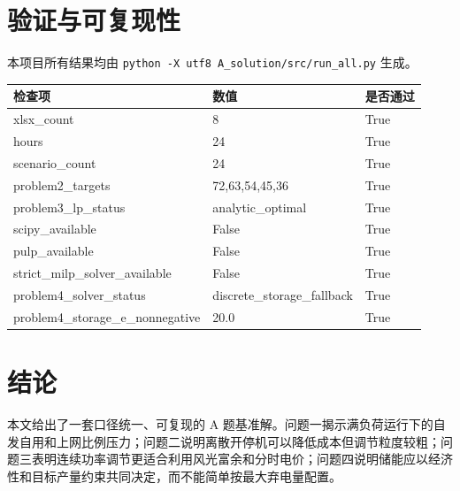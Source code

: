 \documentclass[12pt]{article}
\begin{document}
\section{验证与可复现性}
本项目所有结果均由 \texttt{python -X utf8 A\_solution/src/run\_all.py} 生成。
\begin{longtable}{lll}\toprule
检查项 & 数值 & 是否通过 \\\midrule
xlsx\_count & 8 & True \\
hours & 24 & True \\
scenario\_count & 24 & True \\
problem2\_targets & 72,63,54,45,36 & True \\
problem3\_lp\_status & analytic\_optimal & True \\
scipy\_available & False & True \\
pulp\_available & False & True \\
strict\_milp\_solver\_available & False & True \\
problem4\_solver\_status & discrete\_storage\_fallback & True \\
problem4\_storage\_e\_nonnegative & 20.0 & True \\
\bottomrule
\end{longtable}

\section{结论}
本文给出了一套口径统一、可复现的 A 题基准解。问题一揭示满负荷运行下的自发自用和上网比例压力；问题二说明离散开停机可以降低成本但调节粒度较粗；问题三表明连续功率调节更适合利用风光富余和分时电价；问题四说明储能应以经济性和目标产量约束共同决定，而不能简单按最大弃电量配置。
\end{document}
